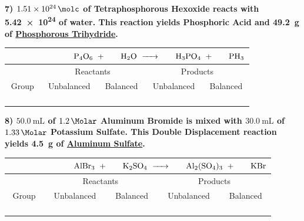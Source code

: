 \documentclass[12pt, oneside, letterpaper]{book}
\begin{document}
\textbf{7) $\qty{1.51e24}{\molc}$ of Tetraphosphorous Hexoxide reacts with \qty{5.42e24}{\molc} of water. This reaction yields Phosphoric Acid and \qty{49.2}{\gram} of \underline{Phosphorous Trihydride}.}
\begin{table}[H]
\centering
\begin{tabular}{|c||c|c||c|c|} 
 \multicolumn{5}{c}{$\phantom{Group 1234567890}
    \ce{P4O6} \ + \ 
    \phantom{123} \ce{H2O} \ \ce{->} \ 
    \phantom{123} \ce{H3PO4} \ + \ 
    \phantom{123} \ce{PH3}$} \\
 \hline
    & \multicolumn{2}{c||}{Reactants} & \multicolumn{2}{c|}{Products} \\
 \hline
 Group & Unbalanced & Balanced & Unbalanced & Balanced\\ 
 \hline\hline
   & & & & \\
 \hline
   & & & & \\
 \hline
  & & & & \\
 \hline
  & & & & \\[1ex] 
 \hline
\end{tabular}
\end{table}


\textbf{8) $\qty{50.0}{\milli\liter}$ of $\qty{1.2}{\Molar}$ Aluminum Bromide is mixed with $\qty{30.0}{\milli\liter}$ of $\qty{1.33}{\Molar}$ Potassium Sulfate. This Double Displacement reaction yields \qty{4.5}{\gram} of \underline{Aluminum Sulfate}.}
\begin{table}[H]
\centering
\begin{tabular}{|c||c|c||c|c|} 
\multicolumn{5}{c}{$\phantom{Group 1234567890}
    \ce{AlBr3} \ + \ 
    \phantom{123} \ce{K2SO4} \ \ce{->} \ 
    \phantom{123} \ce{Al2(SO4)3} \ + \ 
    \phantom{123} \ce{KBr}$} \\
 \hline
    & \multicolumn{2}{c||}{Reactants} & \multicolumn{2}{c|}{Products} \\
 \hline
 Group & Unbalanced & Balanced & Unbalanced & Balanced\\ 
 \hline\hline
   & & & & \\
 \hline
   & & & & \\
 \hline
  & & & & \\
 \hline
  & & & & \\[1ex] 
 \hline
\end{tabular}
\end{table}
\end{document}
